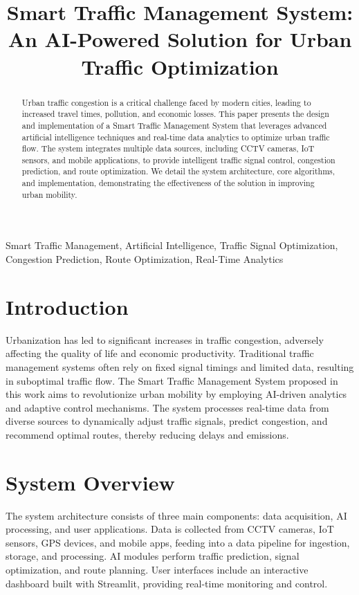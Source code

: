 \documentclass[conference]{IEEEtran}
\title{Smart Traffic Management System: An AI-Powered Solution for Urban Traffic Optimization}
\author{
    \IEEEauthorblockN{Huy Tran, Phu Nguyen, Thant Thiri Maung}
    \IEEEauthorblockA{Department of Computer Science\\
    Ton Duc Thang University\\
    Email: author@example.com}
}
\begin{document}
\maketitle

\begin{abstract}
Urban traffic congestion is a critical challenge faced by modern cities, leading to increased travel times, pollution, and economic losses. This paper presents the design and implementation of a Smart Traffic Management System that leverages advanced artificial intelligence techniques and real-time data analytics to optimize urban traffic flow. The system integrates multiple data sources, including CCTV cameras, IoT sensors, and mobile applications, to provide intelligent traffic signal control, congestion prediction, and route optimization. We detail the system architecture, core algorithms, and implementation, demonstrating the effectiveness of the solution in improving urban mobility.
\end{abstract}

\begin{IEEEkeywords}
Smart Traffic Management, Artificial Intelligence, Traffic Signal Optimization, Congestion Prediction, Route Optimization, Real-Time Analytics
\end{IEEEkeywords}

\section{Introduction}
Urbanization has led to significant increases in traffic congestion, adversely affecting the quality of life and economic productivity. Traditional traffic management systems often rely on fixed signal timings and limited data, resulting in suboptimal traffic flow. The Smart Traffic Management System proposed in this work aims to revolutionize urban mobility by employing AI-driven analytics and adaptive control mechanisms. The system processes real-time data from diverse sources to dynamically adjust traffic signals, predict congestion, and recommend optimal routes, thereby reducing delays and emissions.

\section{System Overview}
The system architecture consists of three main components: data acquisition, AI processing, and user applications. Data is collected from CCTV cameras, IoT sensors, GPS devices, and mobile apps, feeding into a data pipeline for ingestion, storage, and processing. AI modules perform traffic prediction, signal optimization, and route planning. User interfaces include an interactive dashboard built with Streamlit, providing real-time monitoring and control.
\end{document}
